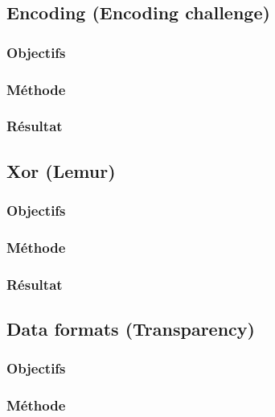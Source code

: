 \documentclass[12pt, a4paper]{article}
\begin{document}
    \subsection{Encoding (Encoding challenge)}
        \subsubsection{Objectifs}
        
        \subsubsection{Méthode}
        
        \subsubsection{Résultat}
        
    \subsection{Xor (Lemur)}
        \subsubsection{Objectifs}
        
        \subsubsection{Méthode}
        
        \subsubsection{Résultat}
        
    \subsection{Data formats (Transparency)}
        \subsubsection{Objectifs}
        
        \subsubsection{Méthode}
        
\end{document}
